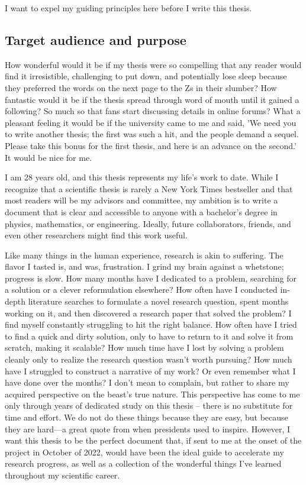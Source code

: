 I want to expel my guiding principles here before I write this thesis. 
\subsection*{Target audience and purpose}
How wonderful would it be if my thesis were so compelling that any reader would find it irresistible, challenging to put down, and potentially lose sleep because they preferred the words on the next page to the Zs in their slumber? How fantastic would it be if the thesis spread through word of mouth until it gained a following? So much so that fans start discussing details in online forums? What a pleasant feeling it would be if the university came to me and said, 'We need you to write another thesis; the first was such a hit, and the people demand a sequel. Please take this bonus for the first thesis, and here is an advance on the second.' It would be nice for me.

I am 28 years old, and this thesis represents my life's work to date. While I recognize that a scientific thesis is rarely a New York Times bestseller and that most readers will be my advisors and committee, my ambition is to write a document that is clear and accessible to anyone with a bachelor's degree in physics, mathematics, or engineering. Ideally, future collaborators, friends, and even other researchers might find this work useful.

Like many things in the human experience, research is akin to suffering. The flavor I tasted is, and was, frustration. I grind my brain against a whetstone; progress is slow. How many months have I dedicated to a problem, searching for a solution or a clever reformulation elsewhere? How often have I conducted in-depth literature searches to formulate a novel research question, spent months working on it, and then discovered a research paper that solved the problem? I find myself constantly struggling to hit the right balance. How often have I tried to find a quick and dirty solution, only to have to return to it and solve it from scratch, making it scalable? How much time have I lost by solving a problem cleanly only to realize the research question wasn't worth pursuing? How much have I struggled to construct a narrative of my work? Or even remember what I have done over the months? I don't mean to complain, but rather to share my acquired perspective on the beast's true nature. This perspective has come to me only through years of dedicated study on this thesis – there is no substitute for time and effort. We do not do these things because they are easy, but because they are hard—a great quote from when presidents used to inspire. However, I want this thesis to be the perfect document that, if sent to me at the onset of the project in October of 2022, would have been the ideal guide to accelerate my research progress, as well as a collection of the wonderful things I've learned throughout my scientific career. 